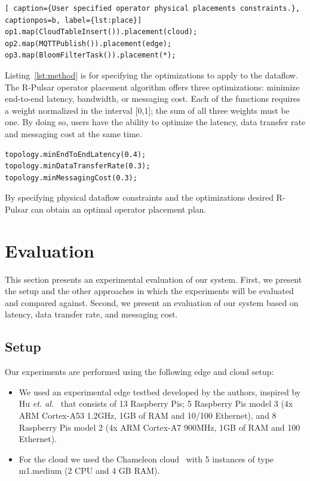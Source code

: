 \begin{lstlisting}[ caption={User specified operator physical placements constraints.}, captionpos=b, label={lst:place}]
op1.map(CloudTableInsert()).placement(cloud);
op2.map(MQTTPublish()).placement(edge);
op3.map(BloomFilterTask()).placement(*);
\end{lstlisting}

Listing~\ref{lst:method} is for specifying the optimizations to apply to the dataflow. The R-Pulsar operator placement algorithm offers three optimizations: minimize end-to-end latency, bandwidth, or messaging cost. Each of the functions requires a weight normalized in the interval [0,1]; the sum of all three weights must be one. By doing so, users have the ability to optimize the latency, data transfer rate and messaging cost at the same time.

\begin{lstlisting}[caption={User specified dataflow optimizations (latency, data transfer rate and cost).}, captionpos=b, label={lst:method}]
topology.minEndToEndLatency(0.4);
topology.minDataTransferRate(0.3);
topology.minMessagingCost(0.3);
\end{lstlisting}

By specifying physical dataflow constraints and the optimizations desired R-Pulsar can obtain an optimal operator placement plan.  

\section{Evaluation}\label{sec:evaluation}
This section presents an experimental evaluation of our system. First, we present the setup and the other approaches in which the experiments will be evaluated and compared against. Second, we present an evaluation of our system based on latency, data transfer rate, and messaging cost. 

\subsection{Setup}

Our experiments are performed using the following edge and cloud setup:

\begin{itemize}

\item We used an experimental edge testbed developed by the authors, inspired by Hu \textit{et. al.}~\cite{Hu2016QuantifyingTI} that consists of 13 Raspberry Pis; 5 Raspberry Pis model 3 (4x ARM Cortex-A53 1.2GHz, 1GB of RAM and 10/100 Ethernet), and 8 Raspberry Pis model 2 (4x ARM Cortex-A7 900MHz, 1GB of RAM and 100 Ethernet). 

\item For the cloud we used the Chameleon cloud~\cite{chameleon} with 5
instances of type m1.medium (2 CPU and 4 GB RAM).

\end{itemize}

